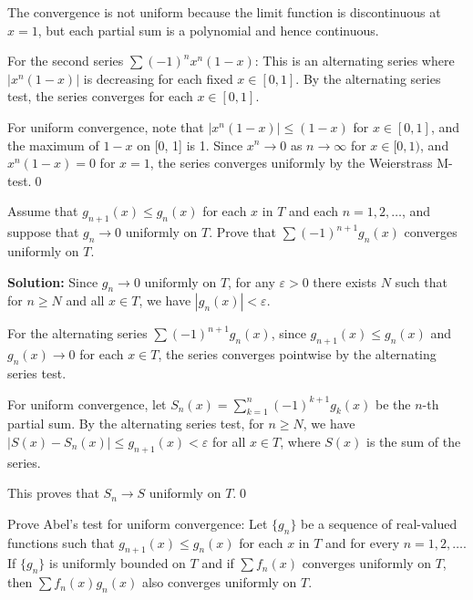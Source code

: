 The convergence is not uniform because the limit function is discontinuous at \( x = 1 \), but each partial sum is a polynomial and hence continuous.

For the second series \( \sum (-1)^n x^n (1 - x) \): This is an alternating series where \( |x^n (1 - x)| \) is decreasing for each fixed \( x \in [0, 1] \). By the alternating series test, the series converges for each \( x \in [0, 1] \).

For uniform convergence, note that \( |x^n (1 - x)| \leq (1 - x) \) for \( x \in [0, 1] \), and the maximum of \( 1 - x \) on [0, 1] is 1. Since \( x^n \to 0 \) as \( n \to \infty \) for \( x \in [0, 1) \), and \( x^n (1 - x) = 0 \) for \( x = 1 \), the series converges uniformly by the Weierstrass M-test.\qed


\begin{problembox}
Assume that \( g_{n+1}(x) \leq g_n(x) \) for each \( x \) in \( T \) and each \( n = 1, 2, \ldots \), and suppose that \( g_n \to 0 \) uniformly on \( T \). Prove that \( \sum (-1)^{n+1} g_n(x) \) converges uniformly on \( T \).
\end{problembox}

\noindent\textbf{Solution:} Since \( g_n \to 0 \) uniformly on \( T \), for any \( \varepsilon > 0 \) there exists \( N \) such that for \( n \geq N \) and all \( x \in T \), we have \( |g_n(x)| < \varepsilon \).

For the alternating series \( \sum (-1)^{n+1} g_n(x) \), since \( g_{n+1}(x) \leq g_n(x) \) and \( g_n(x) \to 0 \) for each \( x \in T \), the series converges pointwise by the alternating series test.

For uniform convergence, let \( S_n(x) = \sum_{k=1}^n (-1)^{k+1} g_k(x) \) be the \( n \)-th partial sum. By the alternating series test, for \( n \geq N \), we have \( |S(x) - S_n(x)| \leq g_{n+1}(x) < \varepsilon \) for all \( x \in T \), where \( S(x) \) is the sum of the series.

This proves that \( S_n \to S \) uniformly on \( T \).\qed




\begin{problembox}
Prove Abel's test for uniform convergence: Let \( \{g_n\} \) be a sequence of real-valued functions such that \( g_{n+1}(x) \leq g_n(x) \) for each \( x \) in \( T \) and for every \( n = 1, 2, \ldots \). If \( \{g_n\} \) is uniformly bounded on \( T \) and if \(\sum f_n(x)\) converges uniformly on \( T \), then \(\sum f_n(x)g_n(x)\) also converges uniformly on \( T \).
\end{problembox}

